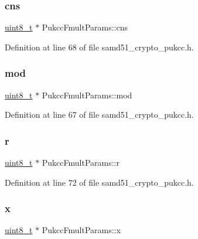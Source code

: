 \subsubsection{\texorpdfstring{cns}{cns}}
{\footnotesize\ttfamily \hyperlink{stdint_8h_aba7bc1797add20fe3efdf37ced1182c5}{uint8\+\_\+t} $\ast$ Pukcc\+Fmult\+Params\+::cns}



Definition at line 68 of file samd51\+\_\+crypto\+\_\+pukcc.\+h.

\mbox{\label{structPukccFmultParams_a380f88e7540dcedab27ac1802ef06985}} 
\subsubsection{\texorpdfstring{mod}{mod}}
{\footnotesize\ttfamily \hyperlink{stdint_8h_aba7bc1797add20fe3efdf37ced1182c5}{uint8\+\_\+t} $\ast$ Pukcc\+Fmult\+Params\+::mod}



Definition at line 67 of file samd51\+\_\+crypto\+\_\+pukcc.\+h.

\mbox{\label{structPukccFmultParams_a67b56fdd3a13e561b523af275d00e050}} 
\subsubsection{\texorpdfstring{r}{r}}
{\footnotesize\ttfamily \hyperlink{stdint_8h_aba7bc1797add20fe3efdf37ced1182c5}{uint8\+\_\+t} $\ast$ Pukcc\+Fmult\+Params\+::r}



Definition at line 72 of file samd51\+\_\+crypto\+\_\+pukcc.\+h.

\mbox{\label{structPukccFmultParams_ab8665adddab7eccfed10073e0e523a2a}} 
\subsubsection{\texorpdfstring{x}{x}}
{\footnotesize\ttfamily \hyperlink{stdint_8h_aba7bc1797add20fe3efdf37ced1182c5}{uint8\+\_\+t} $\ast$ Pukcc\+Fmult\+Params\+::x}



